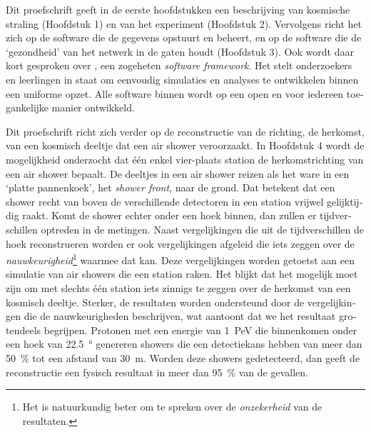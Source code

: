 \begin{otherlanguage}{dutch}
Dit proefschrift geeft in de eerste hoofdstukken een beschrijving van
kosmische straling (Hoofdstuk 1) en van het \hisparc experiment (Hoofdstuk
2).  Vervolgens richt het zich op de software die de gegevens opstuurt en
beheert, en op de software die de `gezondheid' van het \hisparc netwerk in
de gaten houdt (Hoofdstuk 3).  Ook wordt daar kort gesproken over
\sapphire, een zogeheten \emph{software framework}.  Het stelt
onderzoekers en leerlingen in staat om eenvoudig simulaties en analyses te
ontwikkelen binnen een uniforme opzet.  Alle software binnen \hisparc
wordt op een open en voor iedereen toegankelijke manier ontwikkeld.

Dit proefschrift richt zich verder op de reconstructie van de richting, de
herkomst, van een kosmisch deeltje dat een air shower veroorzaakt.  In
Hoofdstuk 4 wordt de mogelijkheid onderzocht dat één enkel vier-plaats
station de herkomstrichting van een air shower bepaalt.  De deeltjes in
een air shower reizen als het ware in een `platte pannenkoek', het
\emph{shower front}, naar de grond.  Dat betekent dat een shower recht van
boven de verschillende detectoren in een station vrijwel gelijktijdig
raakt.  Komt de shower echter onder een hoek binnen, dan zullen er
tijdverschillen optreden in de metingen.  Naast vergelijkingen die uit de
tijdverschillen de hoek reconstrueren worden er ook vergelijkingen
afgeleid die iets zeggen over de \emph{nauwkeurigheid}\footnote{Het is
natuurkundig beter om te spreken over de \emph{onzekerheid} van de
resultaten.} waarmee dat kan.  Deze vergelijkingen worden getoetst aan een
simulatie van air showers die een \hisparc station raken.  Het blijkt dat
het mogelijk moet zijn om met slechts één station iets zinnigs te zeggen
over de herkomst van een kosmisch deeltje.  Sterker, de resultaten worden
ondersteund door de vergelijkingen die de nauwkeurigheden beschrijven, wat
aantoont dat we het resultaat grotendeels begrijpen.  Protonen met een
energie van \SI{1}{\peta\electronvolt} die binnenkomen onder een hoek van
\SI{22.5}{\degree} genereren showers die een detectiekans hebben van meer
dan \SI{50}{\percent} tot een afstand van \SI{30}{\meter}.  Worden deze
showers gedetecteerd, dan geeft de reconstructie een fysisch resultaat in
meer dan \SI{95}{\percent} van de gevallen.


\end{otherlanguage}
